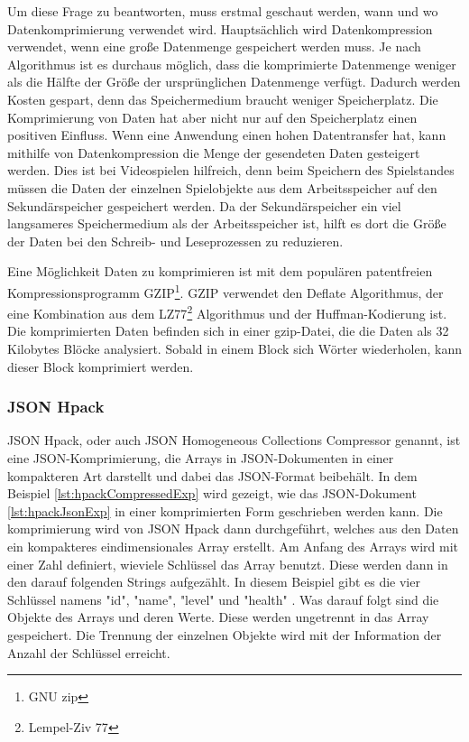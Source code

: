 Um diese Frage zu beantworten, muss erstmal geschaut werden, wann und wo Datenkomprimierung verwendet wird. Hauptsächlich wird Datenkompression verwendet, wenn eine große Datenmenge gespeichert werden muss. Je nach Algorithmus ist es durchaus möglich, dass die komprimierte Datenmenge weniger als die Hälfte der Größe der ursprünglichen Datenmenge verfügt. Dadurch werden Kosten gespart, denn das Speichermedium braucht weniger Speicherplatz. Die Komprimierung von Daten hat aber nicht nur auf den Speicherplatz einen positiven Einfluss. Wenn eine Anwendung einen hohen Datentransfer hat, kann mithilfe von Datenkompression die Menge der gesendeten Daten gesteigert werden. Dies ist bei Videospielen hilfreich, denn beim Speichern des Spielstandes müssen die Daten der einzelnen Spielobjekte aus dem Arbeitsspeicher auf den Sekundärspeicher gespeichert werden. Da der Sekundärspeicher ein viel langsameres Speichermedium als der Arbeitsspeicher ist, hilft es dort die Größe der Daten bei den Schreib- und Leseprozessen zu reduzieren. 
\cite{mediumWhenDataCompression}

Eine Möglichkeit Daten zu komprimieren ist mit dem populären patentfreien Kompressionsprogramm GZIP\footnote{GNU zip}. 
GZIP verwendet den Deflate Algorithmus, der eine Kombination aus dem  LZ77\footnote{Lempel-Ziv 77} Algorithmus und der Huffman-Kodierung ist. Die komprimierten Daten befinden sich in einer gzip-Datei, die die Daten als 32 Kilobytes Blöcke analysiert. Sobald in einem Block sich Wörter wiederholen, kann dieser Block komprimiert werden. 
\cite{gnuGzip}\cite{1414952}\cite{seobilityGzipFunktioniert}

\subsubsection{JSON Hpack}
JSON Hpack, oder auch JSON Homogeneous Collections Compressor genannt, ist eine JSON-Komprimierung, die Arrays in JSON-Dokumenten in einer kompakteren Art darstellt und dabei das JSON-Format beibehält. In dem Beispiel \ref{lst:hpackCompressedExp} wird gezeigt, wie das JSON-Dokument \ref{lst:hpackJsonExp} in einer komprimierten Form geschrieben werden kann. Die komprimierung wird von JSON Hpack dann durchgeführt, welches aus den Daten ein kompakteres eindimensionales Array erstellt. Am Anfang des Arrays wird mit einer Zahl definiert, wieviele Schlüssel das Array benutzt. Diese werden dann in den darauf folgenden Strings aufgezählt. In diesem Beispiel gibt es die vier Schlüssel namens "id", "name", "level" und "health" . Was darauf folgt sind die Objekte des Arrays und deren Werte. Diese werden ungetrennt in das Array gespeichert. Die Trennung der einzelnen Objekte wird mit der Information der Anzahl der Schlüssel erreicht.
\cite{webreflectionLastVersion}

